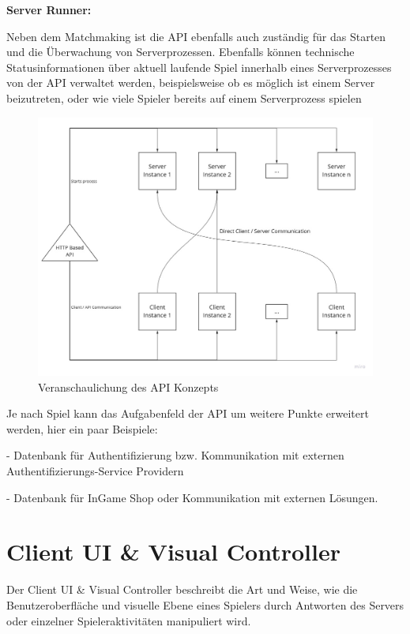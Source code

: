 \textbf{Server Runner:}

Neben dem Matchmaking ist die API ebenfalls auch zuständig für das Starten und die Überwachung von Serverprozessen.
Ebenfalls können technische Statusinformationen über aktuell laufende Spiel innerhalb eines Serverprozesses von der API verwaltet werden, beispielsweise ob es möglich ist einem Server beizutreten, oder wie viele Spieler bereits auf einem Serverprozess spielen

\begin{figure}
	\centering
	\includegraphics[width=150mm]{images/API_Konzept_Diagramm.jpg}
	\caption[API Konzept Diagramm]{Veranschaulichung des API Konzepts}
	\label{pic:API_Konzept_Diagramm}
\end{figure}


Je nach Spiel kann das Aufgabenfeld der API um weitere Punkte erweitert werden, hier ein paar Beispiele:

- Datenbank für Authentifizierung bzw. Kommunikation mit externen Authentifizierungs-Service Providern \cite{Wikipedia.2021c}
 
- Datenbank für InGame Shop oder Kommunikation mit externen Lösungen.

\section{Client UI \& Visual Controller}

Der Client UI \& Visual Controller beschreibt die Art und Weise, wie die Benutzeroberfläche und visuelle Ebene eines Spielers durch Antworten des Servers oder einzelner Spieleraktivitäten manipuliert wird.


